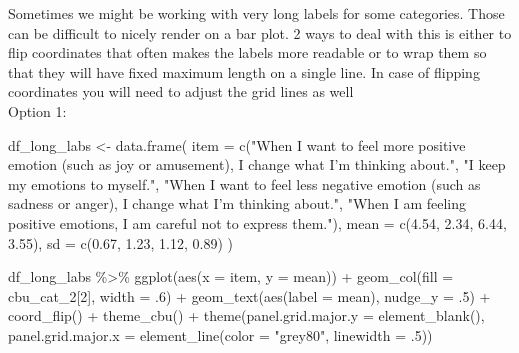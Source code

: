 \documentclass[
  letterpaper,
  DIV=11,
  numbers=noendperiod]{scrreprt}
\newenvironment{Shaded}{\begin{snugshade}}{\end{snugshade}}
\newcommand{\AttributeTok}[1]{\textcolor[rgb]{0.40,0.45,0.13}{#1}}
\newcommand{\DecValTok}[1]{\textcolor[rgb]{0.68,0.00,0.00}{#1}}
\newcommand{\FloatTok}[1]{\textcolor[rgb]{0.68,0.00,0.00}{#1}}
\newcommand{\FunctionTok}[1]{\textcolor[rgb]{0.28,0.35,0.67}{#1}}
\newcommand{\NormalTok}[1]{\textcolor[rgb]{0.00,0.23,0.31}{#1}}
\newcommand{\OtherTok}[1]{\textcolor[rgb]{0.00,0.23,0.31}{#1}}
\newcommand{\SpecialCharTok}[1]{\textcolor[rgb]{0.37,0.37,0.37}{#1}}
\newcommand{\StringTok}[1]{\textcolor[rgb]{0.13,0.47,0.30}{#1}}
\begin{document}
\begin{itemize}
  Sometimes we might be working with very long labels for some
  categories. Those can be difficult to nicely render on a bar plot. 2
  ways to deal with this is either to flip coordinates that often makes
  the labels more readable or to wrap them so that they will have fixed
  maximum length on a single line. In case of flipping coordinates you
  will need to adjust the grid lines as well\\
  Option 1:

\begin{Shaded}
\begin{Highlighting}[]
\NormalTok{df\_long\_labs }\OtherTok{\textless{}{-}} \FunctionTok{data.frame}\NormalTok{(}
    \AttributeTok{item =} \FunctionTok{c}\NormalTok{(}\StringTok{"When I want to feel more positive emotion (such as joy or amusement), I change what I’m thinking about."}\NormalTok{,}
            \StringTok{"I keep my emotions to myself."}\NormalTok{,}
            \StringTok{"When I want to feel less negative emotion (such as sadness or anger), I change what I’m thinking about."}\NormalTok{,}
            \StringTok{"When I am feeling positive emotions, I am careful not to express them."}\NormalTok{),}
    \AttributeTok{mean =} \FunctionTok{c}\NormalTok{(}\FloatTok{4.54}\NormalTok{, }\FloatTok{2.34}\NormalTok{, }\FloatTok{6.44}\NormalTok{, }\FloatTok{3.55}\NormalTok{),}
    \AttributeTok{sd =} \FunctionTok{c}\NormalTok{(}\FloatTok{0.67}\NormalTok{, }\FloatTok{1.23}\NormalTok{, }\FloatTok{1.12}\NormalTok{, }\FloatTok{0.89}\NormalTok{)}
\NormalTok{)}

\NormalTok{df\_long\_labs }\SpecialCharTok{\%\textgreater{}\%}
\FunctionTok{ggplot}\NormalTok{(}\FunctionTok{aes}\NormalTok{(}\AttributeTok{x =}\NormalTok{ item, }\AttributeTok{y =}\NormalTok{ mean)) }\SpecialCharTok{+}
\FunctionTok{geom\_col}\NormalTok{(}\AttributeTok{fill =}\NormalTok{ cbu\_cat\_2[}\DecValTok{2}\NormalTok{], }\AttributeTok{width =}\NormalTok{ .}\DecValTok{6}\NormalTok{) }\SpecialCharTok{+}
\FunctionTok{geom\_text}\NormalTok{(}\FunctionTok{aes}\NormalTok{(}\AttributeTok{label =}\NormalTok{ mean), }\AttributeTok{nudge\_y =}\NormalTok{ .}\DecValTok{5}\NormalTok{) }\SpecialCharTok{+}
\FunctionTok{coord\_flip}\NormalTok{() }\SpecialCharTok{+}
\FunctionTok{theme\_cbu}\NormalTok{() }\SpecialCharTok{+}
\FunctionTok{theme}\NormalTok{(}\AttributeTok{panel.grid.major.y =} \FunctionTok{element\_blank}\NormalTok{(),}
     \AttributeTok{panel.grid.major.x =} \FunctionTok{element\_line}\NormalTok{(}\AttributeTok{color =} \StringTok{"grey80"}\NormalTok{, }\AttributeTok{linewidth =}\NormalTok{ .}\DecValTok{5}\NormalTok{))}
\end{Highlighting}
\end{Shaded}


\end{itemize}
\end{document}
